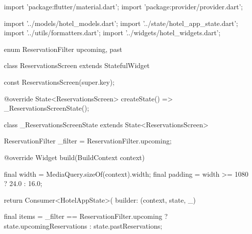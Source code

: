 \documentclass[11pt,a4paper]{article}
\begin{document}
\begin{codeblock}
import 'package:flutter/material.dart';
import 'package:provider/provider.dart';

import '../models/hotel_models.dart';
import '../state/hotel_app_state.dart';
import '../utils/formatters.dart';
import '../widgets/hotel_widgets.dart';

enum ReservationFilter { upcoming, past }

class ReservationsScreen extends StatefulWidget {
  const ReservationsScreen({super.key});

  @override
  State<ReservationsScreen> createState() => _ReservationsScreenState();
}

class _ReservationsScreenState extends State<ReservationsScreen> {
  ReservationFilter _filter = ReservationFilter.upcoming;

  @override
  Widget build(BuildContext context) {
    final width = MediaQuery.sizeOf(context).width;
    final padding = width >= 1080 ? 24.0 : 16.0;

    return Consumer<HotelAppState>(
      builder: (context, state, _) {
        final items = _filter == ReservationFilter.upcoming
            ? state.upcomingReservations
            : state.pastReservations;

}}}
\end{codeblock}
\end{document}
